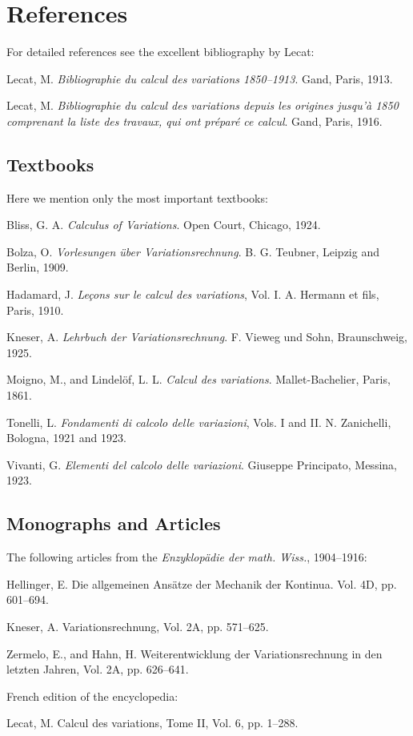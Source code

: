 \section*{References}
For detailed references see the excellent bibliography by Lecat:

Lecat, M. \emph{Bibliographie du calcul des variations 1850--1913}. Gand, Paris, 1913.

Lecat, M. \emph{Bibliographie du calcul des variations depuis les origines jusqu'\`a 1850 comprenant la liste des travaux, qui ont pr\'epar\'e ce calcul}. Gand, Paris, 1916.

\subsection*{Textbooks}
Here we mention only the most important textbooks:

Bliss, G. A. \emph{Calculus of Variations}. Open Court, Chicago, 1924.

Bolza, O. \emph{Vorlesungen \"uber Variationsrechnung}. B. G. Teubner, Leipzig and Berlin, 1909.

Hadamard, J. \emph{Le\c{c}ons sur le calcul des variations}, Vol. I. A. Hermann et fils, Paris, 1910.

Kneser, A. \emph{Lehrbuch der Variationsrechnung}. F. Vieweg und Sohn, Braunschweig, 1925.

Moigno, M., and Lindel\"of, L. L. \emph{Calcul des variations}. Mallet-Bachelier, Paris, 1861.

Tonelli, L. \emph{Fondamenti di calcolo delle variazioni}, Vols. I and II. N. Zanichelli, Bologna, 1921 and 1923.

Vivanti, G. \emph{Elementi del calcolo delle variazioni}. Giuseppe Principato, Messina, 1923.

\subsection*{Monographs and Articles}
The following articles from the \emph{Enzyklop\"adie der math. Wiss.}, 1904--1916:

Hellinger, E. Die allgemeinen Ans\"atze der Mechanik der Kontinua. Vol. 4D, pp. 601--694.

Kneser, A. Variationsrechnung, Vol. 2A, pp. 571--625.

Zermelo, E., and Hahn, H. Weiterentwicklung der Variationsrechnung in den letzten Jahren, Vol. 2A, pp. 626--641.

French edition of the encyclopedia:

Lecat, M. Calcul des variations, Tome II, Vol. 6, pp. 1--288.
